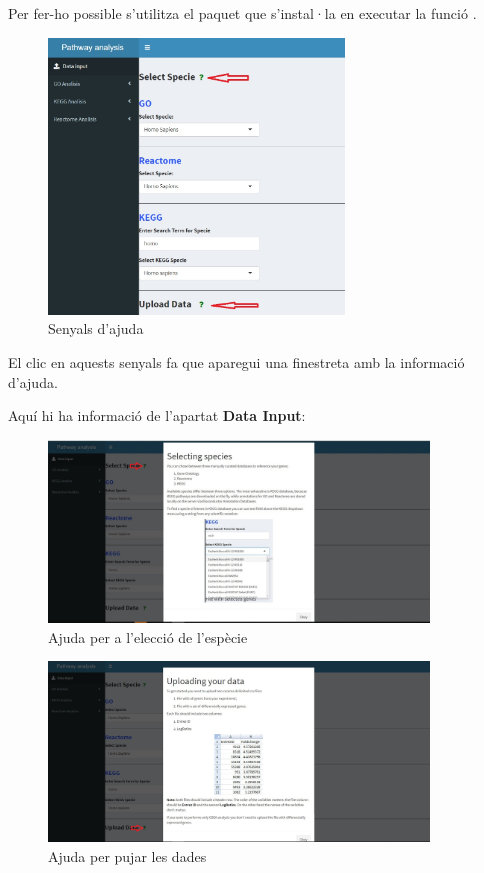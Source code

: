 Per fer-ho possible s'utilitza el paquet  que s'instal·la en executar la funció .

\begin{figure}[H]
\centering
\includegraphics[width=0.7\textwidth]{figures/Help_Data_Input.jpg} 
\caption{Senyals d'ajuda}
\end{figure}

El clic en aquests senyals fa que aparegui una finestreta amb la informació d'ajuda.

Aquí hi ha informació de l'apartat \textbf{Data Input}:

\begin{figure}[H]
\centering
\includegraphics[width=0.9\textwidth]{figures/Help_Specie.jpg} 
\caption{Ajuda per a l'elecció de l'espècie}
\end{figure}

\begin{figure}[H]
\centering
\includegraphics[width=0.9\textwidth]{figures/Help_Upload_Data.jpg} 
\caption{Ajuda per pujar les dades}
\end{figure}

